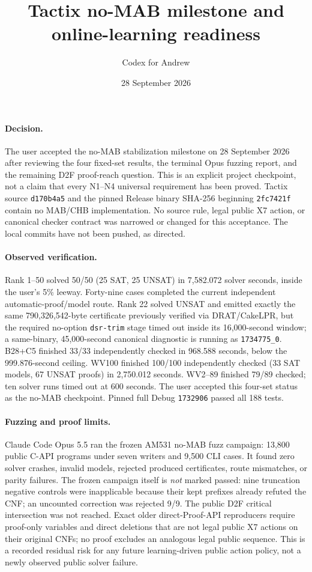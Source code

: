 \documentclass[11pt]{article}
\title{Tactix no-MAB milestone and online-learning readiness}
\author{Codex for Andrew}
\date{28 September 2026}
\begin{document}
\maketitle

\paragraph{Decision.}
The user accepted the no-MAB stabilization milestone on 28 September 2026 after reviewing the four fixed-set results, the terminal Opus fuzzing report, and the remaining D2F proof-reach question. This is an explicit project checkpoint, not a claim that every N1--N4 universal requirement has been proved. Tactix source \texttt{d170b4a5} and the pinned Release binary SHA-256 beginning \texttt{2fc7421f} contain no MAB/CHB implementation. No source rule, legal public X7 action, or canonical checker contract was narrowed or changed for this acceptance. The local commits have not been pushed, as directed.

\paragraph{Observed verification.}
Rank 1--50 solved 50/50 (25 SAT, 25 UNSAT) in 7,582.072 solver seconds, inside the user's 5\% leeway. Forty-nine cases completed the current independent automatic-proof/model route. Rank 22 solved UNSAT and emitted exactly the same 790,326,542-byte certificate previously verified via DRAT/CakeLPR, but the required no-option \texttt{dsr-trim} stage timed out inside its 16,000-second window; a same-binary, 45,000-second canonical diagnostic is running as \texttt{1734775\_0}. B28+C5 finished 33/33 independently checked in 968.588 seconds, below the 999.876-second ceiling. WV100 finished 100/100 independently checked (33 SAT models, 67 UNSAT proofs) in 2,750.012 seconds. WV2--89 finished 79/89 checked; ten solver runs timed out at 600 seconds. The user accepted this four-set status as the no-MAB checkpoint. Pinned full Debug \texttt{1732906} passed all 188 tests.

\paragraph{Fuzzing and proof limits.}
Claude Code Opus 5.5 ran the frozen AM531 no-MAB fuzz campaign: 13,800 public C-API programs under seven writers and 9,500 CLI cases. It found zero solver crashes, invalid models, rejected produced certificates, route mismatches, or parity failures. The frozen campaign itself is \emph{not} marked passed: nine truncation negative controls were inapplicable because their kept prefixes already refuted the CNF; an uncounted correction was rejected 9/9. The public D2F critical intersection was not reached. Exact older direct-Proof-API reproducers require proof-only variables and direct deletions that are not legal public X7 actions on their original CNFs; no proof excludes an analogous legal public sequence. This is a recorded residual risk for any future learning-driven public action policy, not a newly observed public solver failure.
\end{document}
